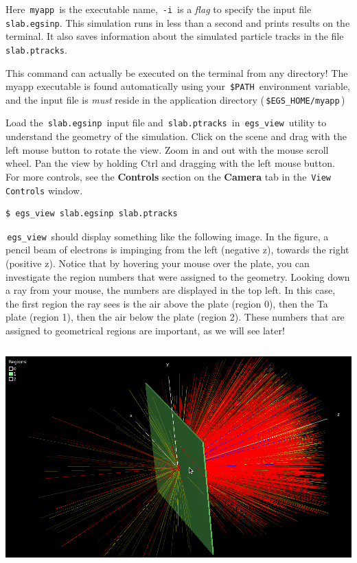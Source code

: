 \documentclass[12pt,twoside]{article}
\begin{document}
Here \,\Verb|myapp|\, is the executable name, \,\Verb|-i|\, is a
\textit{flag} to specify the input file \,\Verb|slab.egsinp|. This
simulation runs in less than a second and prints results on the
terminal. It also saves information about the simulated particle tracks
in the file \,\Verb|slab.ptracks|.

This command can actually be executed on the terminal from any directory! The myapp executable is found automatically using your \,\Verb|$PATH|\, environment variable, and the input file is \textit{must} reside in the application directory (\,\Verb|$EGS_HOME/myapp|\,)

Load the \,\Verb|slab.egsinp|\, input file and \,\Verb|slab.ptracks|\, in
\,\Verb|egs_view|\, utility to understand the geometry of the simulation.
Click on the scene and drag with the left mouse button to rotate the view.
Zoom in and out with the mouse scroll wheel. Pan
the view by holding Ctrl and dragging with the left mouse button. For more controls, see the \textbf{Controls} section on the \textbf{Camera} tab in the \,\Verb|View Controls| window.

\begin{lstlisting}
$ egs_view slab.egsinp slab.ptracks
\end{lstlisting}

\,\Verb|egs_view|\, should display something
like the following image. In the figure, a pencil beam of electrons is impinging
from the left (negative z), towards the right (positive z).
Notice that by hovering your mouse over the plate, you
can investigate the region numbers that were assigned to the geometry. Looking
down a ray from your mouse, the numbers are displayed in the top left. In this
case, the first region the ray sees is the air above the plate (region 0), then
the Ta plate (region 1), then the air below the plate (region 2). These numbers
that are assigned to geometrical regions are important, as we will see later!

\begin{center}
\includegraphics[height=240pt]{figures/ta-plate-example}
\end{center}
\end{document}
